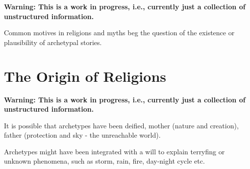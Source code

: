 \documentclass[]{book}
\begin{document}
\textbf{Warning: This is a work in progress, i.e., currently just a collection of unstructured information.}

Common motives in religions and myths beg the question of the existence or plausibility of archetypal stories.

\hypertarget{the-origin-of-religions}{%
\chapter{The Origin of Religions}\label{the-origin-of-religions}}

\textbf{Warning: This is a work in progress, i.e., currently just a collection of unstructured information.}

It is possible that archetypes have been deified, mother (nature and creation), father (protection and sky - the unreachable world).

Archetypes might have been integrated with a will to explain terryfing or unknown phenomena, such as storm, rain, fire, day-night cycle etc.


\end{document}
